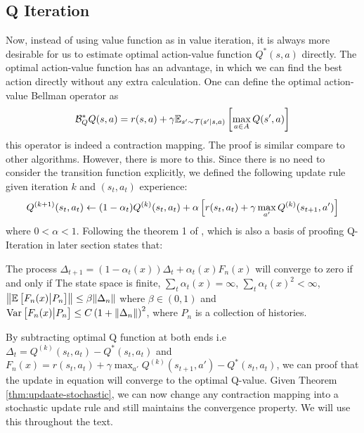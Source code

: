 \subsection{Q Iteration}
\label{sec:chap2-Q-iter}
Now, instead of using value function as in value iteration, it is always more desirable for us to estimate optimal action-value function $Q^*(s, a)$ directly. The optimal action-value function has an advantage, in which we can find the best action directly without any extra calculation. One can define the optimal action-value Bellman operator as 
\begin{equation}
    \mathcal{B}^*_Q Q(s, a) = r(s, a) + \gamma \mathbb{E}_{s' \sim \mathcal{T}(s' | s, a)}\left[ \max_{a\in A} Q(s', a) \right] 
\end{equation}
this operator is indeed a contraction mapping. The proof is similar compare to other algorithms. However, there is more to this. Since there is no need to consider the transition function explicitly, we defined the following update rule given iteration $k$ and $(s_t, a_t)$ experience:
\begin{equation}
\label{eqn:chap2-Q-stochastic-update}
    Q^{(k+1)}(s_t, a_t) \leftarrow (1-\alpha_t) Q^{(k)}(s_t, a_t) + \alpha\left[ r(s_t, a_t) + \gamma \max_{a'} Q^{(k)}(s_{t+1}, a') \right]
\end{equation}
where $0 < \alpha < 1$. Following the theorem 1 of \cite{jaakkola1994convergence}, which is also a basis of proofing Q-Iteration in later section states that:
\begin{theorem}
\label{thm:updaate-stochastic}{\cite{jaakkola1994convergence}}
    The process $\Delta_{t+1} = (1-\alpha_t(x)) \Delta_t + \alpha_t(x) F_n(x) $ will converge to zero if and only if The state space is finite, $\sum_t \alpha_t(x) = \infty$, $\sum_t \alpha_t(x)^2 < \infty$, $\left\|\mathbb{E}\left[ F_n(x) \big| P_n \right] \right\| \le \beta \|\Delta_n\|$ where $\beta \in (0, 1)$ and  $\operatorname{Var}\left[ F_n(x) \big| P_n \right] \le C\left( 1 + \|\Delta_n\| \right)^2$, where $P_n$ is a collection of histories. 
\end{theorem}
By subtracting optimal Q function at both ends i.e $\Delta_t = Q^{(k)}(s_t, a_t) - Q^*(s_t, a_t)$ and $F_n(x) = r(s_t, a_t) + \gamma \max_{a'} Q^{(k)}(s_{t+1}, a') - Q^*(s_t, a_t)$, we can proof that the update in equation \label{eqn:chap2-Q-stochastic-update} will converge to the optimal Q-value. Given Theorem \ref{thm:updaate-stochastic}, we can now change any contraction mapping into a stochastic update rule and still maintains the convergence property. We will use this throughout the text.

